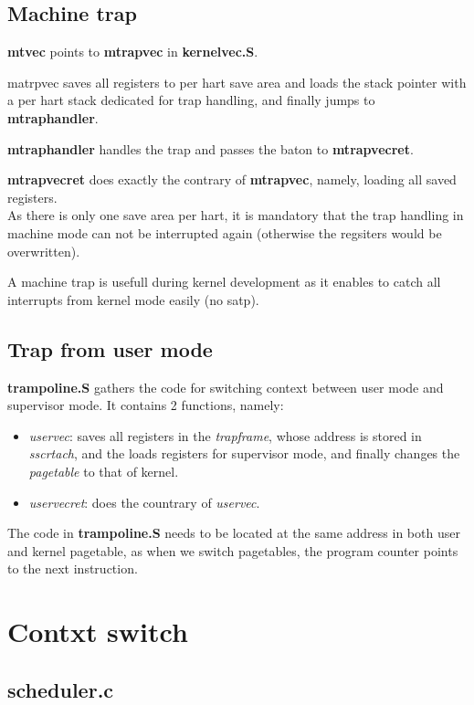 \documentclass[10pt, a4paper]{article}
\begin{document}
\subsection{Machine trap}

\textbf{mtvec} points to \textbf{mtrapvec} in \textbf{kernelvec.S}.

matrpvec saves all registers to per hart save area and loads the stack pointer with a per hart stack dedicated for trap handling, and finally jumps to \textbf{mtraphandler}.

\textbf{mtraphandler} handles the trap and passes the baton to \textbf{mtrapvecret}.

\textbf{mtrapvecret} does exactly the contrary of \textbf{mtrapvec}, namely, loading all saved registers.\\

As there is only one save area per hart, it is mandatory that the trap handling in machine mode can not be interrupted again (otherwise the regsiters would be overwritten).

A machine trap is usefull during kernel development as it enables to catch all interrupts from kernel mode easily (no satp).

\subsection{Trap from user mode}

\textbf{trampoline.S} gathers the code for switching context between user mode and supervisor mode. It contains 2 functions, namely:
\begin{itemize}
\item \textit{uservec}: saves all registers in the \textit{trapframe}, whose address is stored in \textit{sscrtach}, and the loads registers for supervisor mode, and finally changes the \textit{pagetable} to that of kernel.
\item \textit{uservecret}: does the countrary of \textit{uservec}.
\end{itemize}

The code in \textbf{trampoline.S} needs to be located at the same address in both user and kernel pagetable, as when we switch pagetables, the program counter points to the next instruction.

\section{Contxt switch}
\subsection{scheduler.c}
\end{document}
